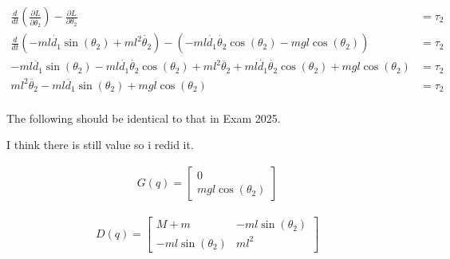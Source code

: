 \begin{solutionbox}[Q1-4]
    \begin{align*}
        \frac{d}{dt} \left(\frac{\partial L}{\partial \dot{\theta_2}} \right) - \frac{\partial L}{\partial \theta_2}                                        & = \tau_2 \\
        \frac{d}{dt} \left(-ml\dot{d_1}\sin(\theta_2)+ml^2\dot{\theta_2} \right) - (-ml\dot{d_1}\dot{\theta_2}\cos(\theta_2)-mgl\cos(\theta_2))             & = \tau_2 \\
        -ml\ddot{d_1}\sin(\theta_2)-ml\dot{d_1}\dot{\theta_2}\cos(\theta_2)+ml^2\ddot{\theta_2} +ml\dot{d_1}\dot{\theta_2}\cos(\theta_2)+ mgl\cos(\theta_2) & = \tau_2 \\
        ml^2\ddot{\theta_2}-ml\ddot{d_1}\sin(\theta_2) + mgl\cos(\theta_2)                                                                                  & = \tau_2 \\
    \end{align*}

\end{solutionbox}

\begin{solutionbox}[Q1-5]
    The following should be identical to that in Exam 2025.

    I think there is still value so i redid it.

    \begin{align*}
        G(q)=
        \begin{bmatrix}
            0 \\
            mgl\cos(\theta_2)
        \end{bmatrix}
    \end{align*}

    \begin{align*}
        D(q) =
        \begin{bmatrix}
            M+m               & -ml\sin(\theta_2) \\
            -ml\sin(\theta_2) & ml^2
        \end{bmatrix}
    \end{align*}

\end{solutionbox}

